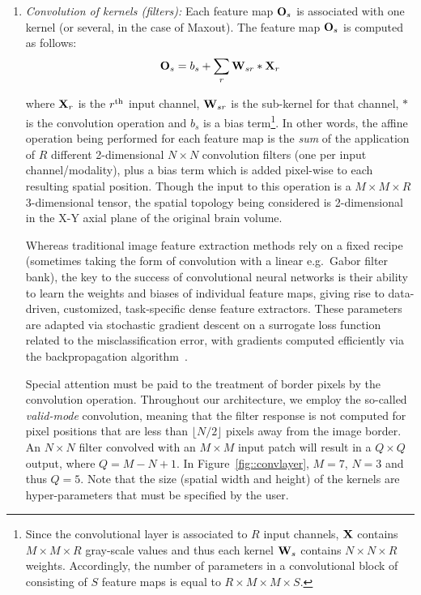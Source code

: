 \documentclass[final,5p,times,twocolumn]{elsarticle}
\begin{document}
\begin{enumerate}

\item {\it Convolution of kernels (filters):} Each feature map ${\bf O}_s$ is associated with one kernel (or several, in the case of Maxout). The feature map ${\bf O}_s$ is computed as follows:
\begin{equation}\label{eq:conv}
{\bf O}_s = b_s + \sum_r {\bf W}_{sr} \ast {\bf X}_r
\end{equation}



where ${\bf X}_r$ is the $r^{\rm th}$ input channel, ${\bf W}_{sr}$ is the sub-kernel for that channel, $\ast$ is the convolution operation and $b_s$ is a bias term\footnote{Since the convolutional layer is associated to $R$ input channels, ${\bf X}$ contains $M\times M\times R$ gray-scale values and thus each kernel  ${\bf W}_{s}$ contains $N\times N\times R$ weights. Accordingly, the number of parameters in a convolutional block of consisting of $S$ feature maps is equal to $R\times M\times M\times S $.}. In other words, the affine operation being performed for each feature map is the \textit{sum} of the application of $R$ different 2-dimensional $N\times N$ convolution filters (one per input channel/modality), plus a bias term which is added pixel-wise to each resulting spatial position. Though the input to this operation is a $M \times M \times R$ 3-dimensional tensor, the spatial topology being considered is 2-dimensional in the X-Y axial plane of the original brain volume.



Whereas traditional image feature extraction methods rely on a fixed recipe (sometimes taking the form of convolution with a linear e.g.\ Gabor filter bank), the key to the success of convolutional neural networks is their ability to learn the weights and biases of individual feature maps, giving rise to data-driven, customized, task-specific dense feature extractors. These parameters are adapted via stochastic gradient descent on a surrogate loss function related to the misclassification error, with gradients computed efficiently via the backpropagation algorithm~\citep{rumelhart1988learning}.

Special attention must be paid to the treatment of border pixels by the convolution operation. Throughout our architecture, we employ the so-called \textit{valid-mode} convolution, meaning that the filter response is not computed for pixel positions that are less than $\lfloor N/2\rfloor$ pixels away from the image border. An $N\times N$ filter convolved with an $M\times M$ input patch will result in a $Q \times Q$ output, where $Q = M - N + 1$. In Figure~\ref{fig::convlayer}, $M = 7$, $N = 3$ and thus $Q = 5$. 
Note that the size (spatial width and height) of the kernels are hyper-parameters that must be specified by the user. 






\end{enumerate}
\end{document}
